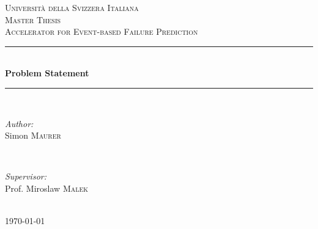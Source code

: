 \documentclass[12pt]{article} %
\begin{document}

\begin{titlepage}

\newcommand{\HRule}{\rule{\linewidth}{0.5mm}} %

\center %

\textsc{\LARGE Università della Svizzera Italiana}\\[1.5cm] %
\textsc{\Large Master Thesis}\\[0.5cm] %
\textsc{\large Accelerator for Event-based Failure Prediction}\\[0.5cm] %

\HRule \\[0.4cm]
{ \huge \bfseries Problem Statement}\\[0.4cm] %
\HRule \\[1.5cm]

\begin{minipage}{0.4\textwidth}
\begin{flushleft} \large
\emph{Author:}\\
Simon \textsc{Maurer} %
\end{flushleft}
\end{minipage}
~
\begin{minipage}{0.4\textwidth}
\begin{flushright} \large
\emph{Supervisor:} \\
Prof. Miroslaw \textsc{Malek} %
\end{flushright}
\end{minipage}\\[4cm]

{\large \today}\\[3cm] %


\vfill %

\end{titlepage}
\end{document}
